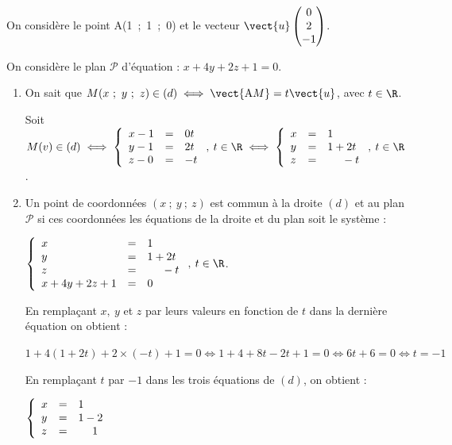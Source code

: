 \medskip



On considère le point A(1~;~1~;~0) et le vecteur $\vect{u}\begin{pmatrix}0\\2\\- 1\end{pmatrix}$.

On considère le plan $\mathcal{P}$ d'équation : $x + 4y + 2z + 1 = 0$.

\medskip

\begin{enumerate}
\item 


On sait que $M(x~;~y~;~z) \in (d) \iff \vect{\text{A}M} = t \vect{u}$, avec $t \in \R$.

Soit $M(v) \in (d) \iff \left\{\begin{array}{l c l}
x - 1&=&0t\\
y - 1&=&2t\\
z - 0&=&-t
\end{array}\right., \: t \in \R \iff \left\{\begin{array}{l c l}
x &=&1\\
y&=&1 + 2t\\
z&=&\phantom{1 + } -t
\end{array}\right., \: t \in \R$.
\item 
Un point de coordonnées $(x~;~y~;~z)$ est commun à la droite $(d)$ et au plan $\mathcal{P}$ si ces coordonnées les équations de la droite et du plan soit le système :

$\left\{\begin{array}{l c l}
x &=&1\\
y&=&1 + 2t\\
z&=&\phantom{1 + } -t\\
x + 4y + 2z + 1&=&0
\end{array}\right., \: t \in \R$.

En remplaçant $x, \:y$ et $z$ par leurs valeurs en fonction de $t$ dans la dernière équation on obtient :

$1 + 4(1 + 2t) + 2\times (- t) + 1 = 0 \iff 1 + 4 + 8t - 2t + 1 = 0 \iff 6t + 6 = 0 \iff t = - 1$

En remplaçant $t$ par $- 1$ dans les trois équations de $(d)$, on obtient :

$\left\{\begin{array}{l c l}
x &=&1\\
y&=&1 - 2\\
z&=&\phantom{1 + } 1
\end{array}\right.$


\end{enumerate}
